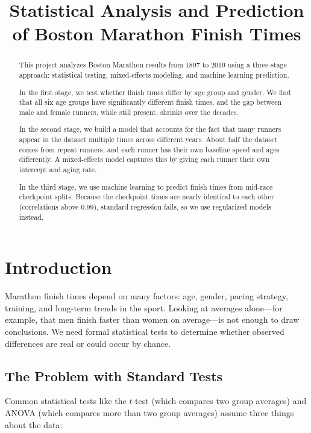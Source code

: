 \documentclass[conference]{IEEEtran}
\title{Statistical Analysis and Prediction\\of Boston Marathon Finish Times}
\begin{document}
\maketitle

\begin{abstract}
    This project analyzes Boston Marathon results from 1897 to 2019 using a three-stage approach: statistical testing, mixed-effects modeling, and machine learning prediction.

    In the first stage, we test whether finish times differ by age group and gender. We find that all six age groups have significantly different finish times, and the gap between male and female runners, while still present, shrinks over the decades.

    In the second stage, we build a model that accounts for the fact that many runners appear in the dataset multiple times across different years. About half the dataset comes from repeat runners, and each runner has their own baseline speed and ages differently. A mixed-effects model captures this by giving each runner their own intercept and aging rate.

    In the third stage, we use machine learning to predict finish times from mid-race checkpoint splits. Because the checkpoint times are nearly identical to each other (correlations above 0.99), standard regression fails, so we use regularized models instead.
\end{abstract}

\section{Introduction}

Marathon finish times depend on many factors: age, gender, pacing strategy, training, and long-term trends in the sport. Looking at averages alone---for example, that men finish faster than women on average---is not enough to draw conclusions. We need formal statistical tests to determine whether observed differences are real or could occur by chance.

\subsection{The Problem with Standard Tests}

Common statistical tests like the $t$-test (which compares two group averages) and ANOVA (which compares more than two group averages) assume three things about the data:
\end{document}
